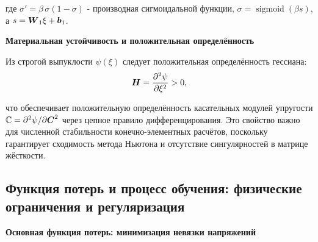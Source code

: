 где $\sigma' = \beta\,\sigma(1-\sigma)$ - производная сигмоидальной функции, 
$\sigma=\operatorname{sigmoid}(\beta s)$, а $s=\boldsymbol{W}_1\xi+\boldsymbol{b}_1$.

\textbf{Материальная устойчивость и положительная определённость}


Из строгой выпуклости \(\psi(\xi)\) следует положительная определённость гессиана:
\begin{equation}
 \boldsymbol{H} = \frac{\partial^2\psi}{\partial\xi^2} > 0,
\label{eq:positive_hessian}
\end{equation}

что обеспечивает положительную определённость касательных модулей упругости 
$\mathbb{C} = \partial^2\psi/\partial\boldsymbol{C}^2$ через цепное правило дифференцирования. 
Это свойство важно для численной стабильности конечно-элементных расчётов, 
поскольку гарантирует сходимость метода Ньютона и отсутствие сингулярностей в матрице жёсткости.




\subsection{Функция потерь и процесс обучения: физические ограничения и регуляризация}

\textbf{Основная функция потерь: минимизация невязки напряжений}

